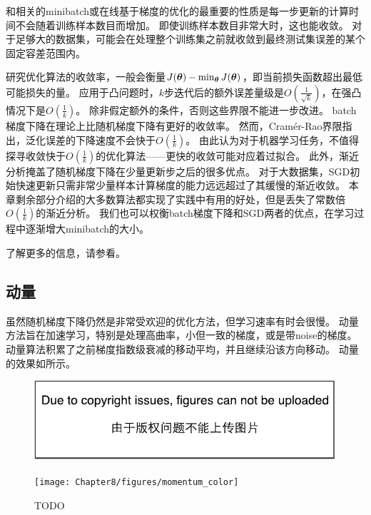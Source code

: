 和相关的\gls{minibatch}或在线基于梯度的优化的最重要的性质是每一步更新的计算时间不会随着训练样本数目而增加。
即使训练样本数目非常大时，这也能收敛。
对于足够大的数据集，可能会在处理整个训练集之前就收敛到最终测试集误差的某个固定容差范围内。

研究优化算法的收敛率，一般会衡量$J(\boldsymbol{\theta}) - \min_{\boldsymbol{\theta}} J(\boldsymbol{\theta})$，即当前损失函数超出最低可能损失的量。
应用于凸问题时，$k$步迭代后的额外误差量级是$O(\frac{1}{\sqrt{k}})$，在强凸情况下是$O(\frac{1}{k})$。
除非假定额外的条件，否则这些界限不能进一步改进。
\gls{batch}梯度下降在理论上比随机梯度下降有更好的收敛率。
然而，Cram\'er-Rao界限\citep{Cramer-1946,Rao-1945}指出，泛化误差的下降速度不会快于$O(\frac{1}{k})$。
\cite{bottou-bousquet-2008-small}由此认为对于机器学习任务，不值得探寻收敛快于$O(\frac{1}{k})$的优化算法——更快的收敛可能对应着过拟合。
此外，渐近分析掩盖了随机梯度下降在少量更新步之后的很多优点。
对于大数据集，SGD初始快速更新只需非常少量样本计算梯度的能力远远超过了其缓慢的渐近收敛。
本章剩余部分介绍的大多数算法都实现了实践中有用的好处，但是丢失了常数倍$O(\frac{1}{k})$的渐近分析。
我们也可以权衡\gls{batch}梯度下降和\gls{SGD}两者的优点，在学习过程中逐渐增大\gls{minibatch}的大小。


了解更多的信息，请参看\cite{Bottou98}。

\subsection{动量}
\label{sec:momentum}
虽然随机梯度下降仍然是非常受欢迎的优化方法，但学习速率有时会很慢。
动量方法\citep{polyak1964some}旨在加速学习，特别是处理高曲率，小但一致的梯度，或是带\gls{noise}的梯度。
动量算法积累了之前梯度指数级衰减的移动平均，并且继续沿该方向移动。
动量的效果如所示。

\begin{figure}[!htb]
\ifOpenSource
\centerline{\includegraphics{figure.pdf}}
\else
\centerline{\texttt{[image: Chapter8/figures/momentum\_color]}}
\fi
\caption{TODO}
\label{fig:chap8_momentum}
\end{figure}


